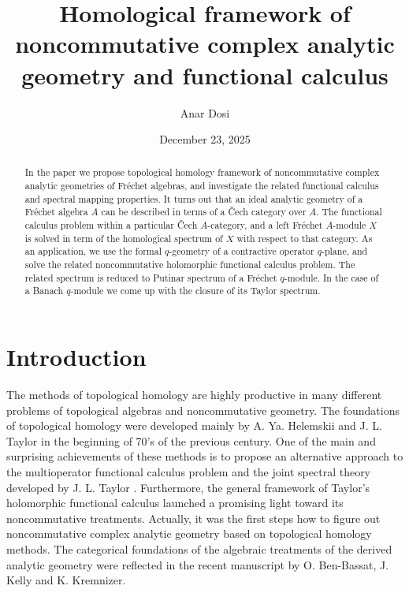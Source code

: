 \documentclass[12pt]{amsart}%
\theoremstyle{plain}
\numberwithin{equation}{section}
\numberwithin{equation}{section}
\numberwithin{theorem}{section}
\numberwithin{lemma}{section}
\numberwithin{remark}{section}
\numberwithin{example}{section}
\numberwithin{proposition}{section}
\numberwithin{definition}{section}
\numberwithin{corollary}{section}
\begin{document}
\title[Homological framework ]{Homological framework of noncommutative complex analytic geometry and
functional calculus}
\author{Anar Dosi}
\address{College of Mathematical Sciences, Harbin Engineering University, Nangang
District, Harbin, 150001, China}
\date{December 23, 2025}
\begin{abstract}
In the paper we propose topological homology framework of noncommutative
complex analytic geometries of Fr\'{e}chet algebras, and investigate the
related functional calculus and spectral mapping properties. It turns out that
an ideal analytic geometry of a Fr\'{e}chet algebra $A$ can be described in
terms of a \v{C}ech category over $A$. The functional calculus problem within
a particular \v{C}ech $A$-category, and a left Fr\'{e}chet $A$-module $X$ is
solved in term of the homological spectrum of $X$ with respect to that
category. As an application, we use the formal $q$-geometry of a contractive
operator $q$-plane, and solve the related noncommutative holomorphic
functional calculus problem. The related spectrum is reduced to Putinar
spectrum of a Fr\'{e}chet $q$-module. In the case of a Banach $q$-module we
come up with the closure of its Taylor spectrum.

\end{abstract}
\maketitle


\section{Introduction\label{secInt}}

The methods of topological homology are highly productive in many different
problems of topological algebras and noncommutative geometry. The foundations
of topological homology were developed mainly by A. Ya. Helemskii
\cite{HelHom} and J. L. Taylor \cite{Tay1} in the beginning of 70's of the
previous century. One of the main and surprising achievements of these methods
is to propose an alternative approach to the multioperator functional calculus
problem and the joint spectral theory developed by J. L. Taylor \cite{Tay2}.
Furthermore, the general framework of Taylor's holomorphic functional calculus
launched a promising light toward its noncommutative treatments. Actually, it
was the first steps how to figure out noncommutative complex analytic geometry
based on topological homology methods. The categorical foundations of the
algebraic treatments of the derived analytic geometry were reflected in the
recent manuscript \cite{Oren} by O. Ben-Bassat, J. Kelly and K. Kremnizer.
\end{document}

